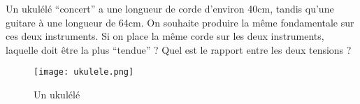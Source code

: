 %
%
    Un ukulélé \enquote{concert} a une longueur de corde d'environ 40cm, tandis qu'une guitare à une longueur de 64cm. On souhaite produire la même fondamentale sur ces deux instruments. Si on place la même corde sur les deux instruments, laquelle doit être la plus \enquote{tendue} ? Quel est le rapport entre les deux tensions ?
    \begin{figure}[h!]
        \centering
        \texttt{[image: ukulele.png]}
        \caption{Un ukulélé}
    \end{figure}
